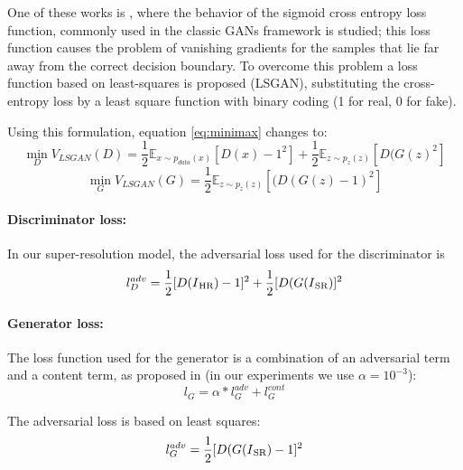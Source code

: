 \documentclass{article}
\begin{document}
One of these works is \cite{mao:lsgan}, where the behavior of the sigmoid cross entropy loss function, commonly used in the classic GANs framework is studied; this loss function causes the problem of vanishing gradients for the samples that lie far away from the correct decision boundary. To overcome this problem a loss function based on least-squares is proposed (LSGAN), substituting the cross-entropy loss by a least square function with binary coding (1 for real, 0 for fake).

Using this formulation, equation \ref{eq:minimax} changes to:
\begin{equation}\label{eq:min_D}
	\min_{D} V_{LSGAN}(D) = \frac{1}{2} \mathbb{E}_{x \sim p_{data}(x)}[D(x)-1^2]+ \frac{1}{2} \mathbb{E}_{z \sim p_{z}(z)}[D(G(z)^2]
\end{equation}
\begin{equation}\label{eq:min_G}
	\min_{G} V_{LSGAN}(G) = \frac{1}{2} \mathbb{E}_{z \sim p_{z}(z)}[(D(G(z)-1)^2]
\end{equation}

\paragraph{Discriminator loss:}
In our super-resolution model, the adversarial loss used for the discriminator is
\begin{equation}\label{eq:cost_DSR}
	l_{D}^{adv} = \frac{1}{2}[D(I\textsubscript{HR})-1]^{2} + \frac{1}{2}[D(G(I\textsubscript{SR})]^{2}
\end{equation}

\paragraph{Generator loss:}
The loss function used for the generator is a combination of an adversarial term and a content term, as proposed in \cite{ledig:srgan} (in our experiments we use $\alpha = 10^{-3}$):
\begin{equation}
l_{G} = \alpha*l_{G}^{adv} + l_{G}^{cont}
\end{equation}

The adversarial loss is based on least squares:
\begin{equation}\label{eq:cost_Adv}
	l_{G}^{adv} = \frac{1}{2}[D(G(I\textsubscript{SR})-1]^{2}
\end{equation}
\end{document}
